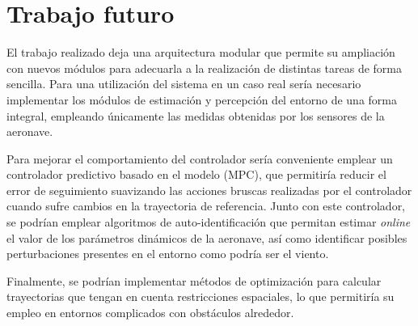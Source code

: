 \section{Trabajo futuro}

El trabajo realizado deja una arquitectura modular que permite su ampliación con nuevos módulos para adecuarla a la realización de distintas tareas de forma sencilla. Para una utilización del sistema en un caso real sería necesario implementar los módulos de estimación y percepción del entorno de una forma integral, empleando únicamente las medidas obtenidas por los sensores de la aeronave. 

Para mejorar el comportamiento del controlador sería conveniente emplear un controlador predictivo basado en el modelo (MPC), que permitiría reducir el error de seguimiento suavizando las acciones bruscas realizadas por el controlador cuando sufre cambios en la trayectoria de referencia. Junto con este controlador, se podrían emplear algoritmos de auto-identificación que permitan estimar \textit{online} el valor de los parámetros dinámicos de la aeronave, así como identificar posibles perturbaciones presentes en el entorno como podría ser el viento.

Finalmente, se podrían implementar métodos de optimización para calcular trayectorias que tengan en cuenta restricciones espaciales, lo que permitiría su empleo en entornos complicados con obstáculos alrededor. 











